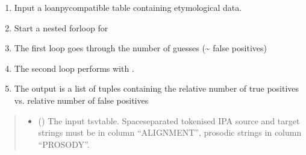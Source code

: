 \documentclass[letterpaper,10pt,english]{sphinxmanual}
\begin{document}
\begin{fulllineitems}
\label{\detokenize{documentation:loanpy.eval_sca.eval_all}}
\pysigstartsignatures
{}
\pysigstopsignatures\begin{enumerate}
%
\item {} 
\sphinxAtStartPar
Input a loanpy\sphinxhyphen{}compatible table containing etymological data.

\item {} 
\sphinxAtStartPar
Start a nested for\sphinxhyphen{}loop for

\item {} 
\sphinxAtStartPar
The first loop goes through the number of guesses (\textasciitilde{} false positives)

\item {} 
\sphinxAtStartPar
The second loop performs 
with .

\item {} 
\sphinxAtStartPar
The output is a list of tuples containing the relative number of
true positives vs. relative number of false positives

\end{enumerate}
\begin{quote}\begin{description}
\begin{itemize}
\item {} 
\sphinxAtStartPar
{} () \textendash{} The input tsv\sphinxhyphen{}table. Space\sphinxhyphen{}separated tokenised IPA source
and target strings must be in column “ALIGNMENT”, prosodic
strings in column “PROSODY”.


\end{itemize}
\end{description}
\end{quote}
\end{fulllineitems}
\end{document}
